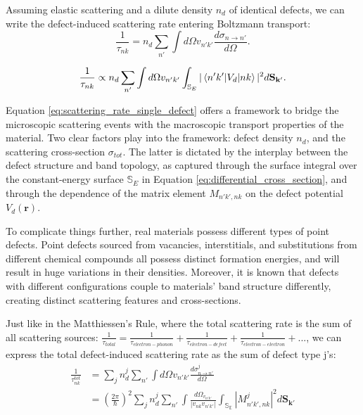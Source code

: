Assuming elastic scattering and a dilute density $n_d$ of identical defects, we can write the defect-induced scattering rate entering Boltzmann transport: 
\begin{equation}
	\label{eq:scattering_rate_single_defect}
	\frac{1}{\tau_{nk}} = n_d \sum_{n'}\int d\Omega v_{n'k'} \frac{d\sigma_{n\rightarrow n'}}{d\Omega}. 
\end{equation}


\begin{equation}
	\frac{1}{\tau_{nk}} \propto n_d \sum_{n'}\int d\Omega v_{n'k'} \int_{\mathbb{S}_E}|\braket{n'k'|V_d|nk}|^2 {d\mathbf{S_{k'}}}. 
\end{equation}


Equation \ref{eq:scattering_rate_single_defect} offers a framework to bridge the microscopic scattering events with the macroscopic transport properties of the material. Two clear factors play into the framework: defect density $n_d$, and the scattering cross-section $\sigma_{tot}$. The latter is dictated by the interplay between the defect structure and band topology, as captured through the surface integral over the constant-energy surface $\mathbb{S}_E$ in Equation \ref{eq:differential_cross_section}, and through the dependence of the matrix element $M_{n'k',nk}$ on the defect potential $V_d(\mathbf{r})$.

To complicate things further, real materials possess different types of point defects\cite{stuartScanningTunnellingMicroscopy2021,bertoldoQuantumPointDefects2022}. Point defects sourced from vacancies, interstitials, and substitutions from different chemical compounds all possess distinct formation energies\cite{bertoldoQuantumPointDefects2022,lopesDefectFormationEnergy2023}, and will result in huge variations in their densities. Moreover, it is known that defects with different configurations couple to materials' band structure differently, creating distinct scattering features and cross-sections\cite{butlerQuasiparticleInterferenceZrSiS2017,chiSignInversionSuperconducting2014,derryQuasiparticleInterferenceMagnetic2015a}. 

Just like in the Matthiessen’s Rule, where the total scattering rate is the sum of all scattering sources: $\frac{1}{\tau_{total}} = \frac{1}{\tau_{electron-phonon}} + \frac{1}{\tau_{electron-defect}} + \frac{1}{\tau_{electron-electron}}+...$, we can express the total defect-induced scattering rate as the sum of defect type j's: 
\begin{align}
	\label{eq:scattering_rate_multi_defect1}
	\frac{1}{\tau_{nk}^{tot}} &= \sum_j n_d^j \sum_{n'}\int d\Omega v_{n'k'} \frac{d\sigma^j_{n\rightarrow n'}}{d\Omega}\\
	&= (\frac{2\pi}{\hslash})^2 \sum_j n_d^j \sum_{n'} \int \frac{d\Omega_{v_{n'k'}}}{|v_{nk}v_{n'k'}|}\int_{\mathbb{S_E}}|M_{n'k',nk}^j|^2 d\mathbf{S_{k'}}\label{eq:scattering_rate_multi_defect2}
\end{align}

